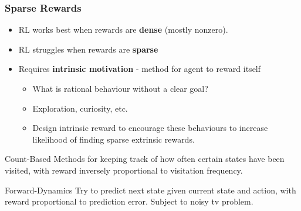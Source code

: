 \documentclass{beamer}
\begin{document}
\begin{frame}
  \frametitle{Sparse Rewards}
  \begin{itemize}
    \item RL works best when rewards are \textbf{dense} (mostly nonzero).
    \item RL struggles when rewards are \textbf{sparse}
    \item Requires \textbf{intrinsic motivation} - method for agent to reward itself
    \begin{itemize}
      \item What is rational behaviour without a clear goal?
      \item Exploration, curiosity, etc.
      \item Design intrinsic reward to encourage these behaviours to increase likelihood of finding sparse extrinsic rewards.
    \end{itemize}
  \end{itemize}
  \begin{exampleblock}{Count-Based}
    Methods for keeping track of how often certain states have been visited, with reward inversely proportional to visitation frequency.
  \end{exampleblock}
  \begin{exampleblock}{Forward-Dynamics}
    Try to predict next state given current state and action, with reward proportional to prediction error. Subject to noisy tv problem.
  \end{exampleblock}
\end{frame}
\end{document}

